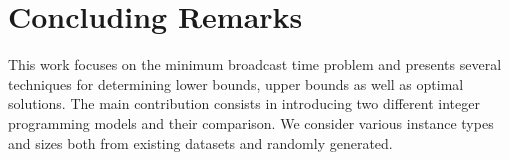 \section{Concluding Remarks}

This work focuses on the minimum broadcast time problem and presents several techniques for determining lower bounds, upper bounds as well as optimal solutions.
The main contribution consists in introducing two different integer programming models and their comparison.
We consider various instance types and sizes both from existing datasets and randomly generated.
